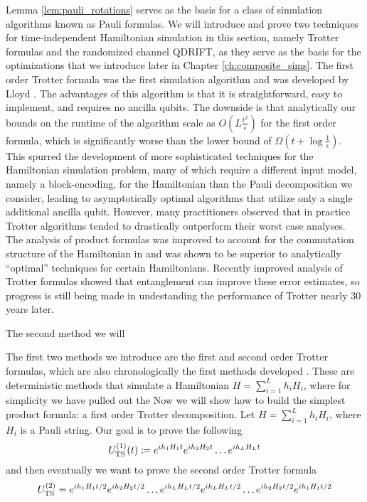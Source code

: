Lemma \ref{lem:pauli_rotations} serves as the basis for a class of simulation algorithms known as Pauli formulas.
We will introduce and prove two techniques for time-independent Hamiltonian simulation in this section, namely Trotter formulas and the randomized channel QDRIFT, as they serve as the basis for the optimizations that we introduce later in Chapter \ref{ch:composite_sims}. The first order Trotter formula was the first simulation algorithm and was developed by Lloyd \cite{lloyd1996universal}. The advantages of this algorithm is that it is straightforward, easy to implement, and requires no ancilla qubits. The downside is that analytically our bounds on the runtime of the algorithm scale as $O\left( L \frac{t^2}{\epsilon}\right)$ for the first order formula, which is significantly worse than the lower bound of $\Omega\left(t + \log \frac{1}{\epsilon} \right)$. This spurred the development of more sophisticated techniques for the Hamiltonian simulation problem, many of which require a different input model, namely a block-encoding, for the Hamiltonian than the Pauli decomposition we consider, leading to asymptotically optimal algorithms \cite{low2019hamiltonian} that utilize only a single additional ancilla qubit. However, many practitioners observed that in practice Trotter algorithms tended to drastically outperform their worst case analyses. The analysis of product formulas was improved to account for the commutation structure of the Hamiltonian in \cite{childs2021theory} and was shown to be superior to analytically ``optimal'' techniques for certain Hamiltonians. Recently improved analysis of Trotter formulas showed that entanglement can improve these error estimates, so progress is still being made in undestanding the performance of Trotter nearly 30 years later. 

The second method we will 


The first two methods we introduce are the first and second order Trotter formulas, which are also chronologically the first methods developed \cite{lloyd1996universal}. These are deterministic methods that simulate a Hamiltonian $H = \sum_{i = 1}^L h_i H_i$, where for simplicity we have pulled out the 
Now we will show how to build the simplest product formula: a first order Trotter decomposition. 
Let $H = \sum_{i = 1}^{L} h_i H_i$, where $H_i$ is a Pauli string. Our goal is to prove the following
\begin{equation}
    U_{\rm TS}^{(1)}(t) \coloneqq e^{i h_1 H_1 t}e^{i h_2 H_2 t} \ldots e^{i h_L H_L t} 
\end{equation}
and then eventually we want to prove the second order Trotter formula
\begin{equation}
    U_{\rm TS}^{(2)} = e^{i h_1 H_1 t/2} e^{i h_2 H_2 t/2} \ldots e^{i h_L H_L t / 2} e^{i h_L H_L t / 2} \ldots e^{i h_2 H_2 t/2} e^{i h_1 H_1 t/2}
\end{equation}


